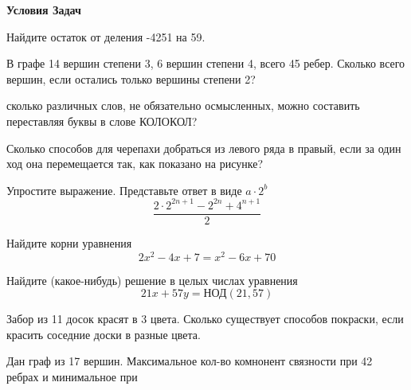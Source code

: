 \documentclass[12pt]{article}
\begin{document}
\centerline{\large \bf Условия Задач}
\begin{enumerate}
\item Найдите остаток от деления -4251 на 59.
\item В графе 14 вершин степени 3, 6 вершин степени 4, всего 45 ребер. Сколько всего вершин, если
остались только вершины степени 2?
\item сколько различных слов, не обязательно осмысленных, можно составить переставляя буквы в слове
КОЛОКОЛ?

\begin{minipage}{0.5\textwidth}
\item Сколько способов для черепахи добраться из левого ряда в правый, если за один ход она
перемещается так, как показано на рисунке?
\item Упростите выражение. Представьте ответ в виде $a \cdot 2^{b}$
\[ \frac{2 \cdot 2^{2n + 1} - 2^{2n} + 4^{n + 1}}{2}\]
\item Найдите корни уравнения
\[ 2x^2 - 4x + 7 = x^2 - 6x + 70\]
\end{minipage}
\begin{minipage}{0.4\textwidth}
\end{minipage}
\item Найдите (какое-нибудь) решение в целых числах уравнения
\[ 21x + 57y = \text{НОД}(21, 57)\]
\item Забор из 11 досок красят в 3 цвета. Сколько существует способов покраски, если красить
соседние доски в разные цвета.
\item Дан граф из 17 вершин. Максимальное кол-во комнонент связности при 42 ребрах и минимальное при

\end{enumerate}
\end{document}

